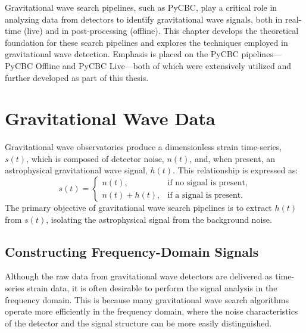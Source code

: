 



Gravitational wave search pipelines, such as PyCBC, play a critical role in analyzing data from detectors to identify gravitational wave signals, both in real-time (live) and in post-processing (offline). This chapter develops the theoretical foundation for these search pipelines and explores the techniques employed in gravitational wave detection. Emphasis is placed on the PyCBC pipelines---PyCBC Offline and PyCBC Live---both of which were extensively utilized and further developed as part of this thesis.

\section{\label{2:sec:gw-data}Gravitational Wave Data}

Gravitational wave observatories produce a dimensionless strain time-series, $s(t)$, which is composed of detector noise, $n(t)$, and, when present, an astrophysical gravitational wave signal, $h(t)$. This relationship is expressed as:
%
\[
    s(t) =
    \begin{cases}
        n(t), & \text{if no signal is present}, \\
        n(t) + h(t), & \text{if a signal is present}.
    \end{cases}
\]
%
The primary objective of gravitational wave search pipelines is to extract $h(t)$ from $s(t)$, isolating the astrophysical signal from the background noise.



\subsection{Constructing Frequency-Domain Signals}

Although the raw data from gravitational wave detectors are delivered as time-series strain data, it is often desirable to perform the signal analysis in the frequency domain. This is because many gravitational wave search algorithms operate more efficiently in the frequency domain, where the noise characteristics of the detector and the signal structure can be more easily distinguished.

